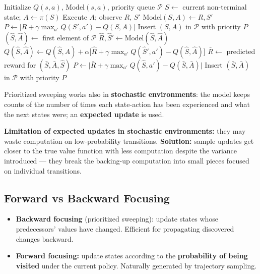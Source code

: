\documentclass[11pt,a4paper]{article}
\theoremstyle{definition}
\theoremstyle{plain}
\theoremstyle{remark}
\begin{document}
\begin{algorithm}
\caption{Prioritized Sweeping (deterministic environments)}
\begin{algorithmic}
\STATE Initialize $Q(s, a)$, $\text{Model}(s, a)$, priority queue $\mathcal{P}$
\LOOP
    \STATE $S \leftarrow$ current non-terminal state; $A \leftarrow \pi(S)$
    \STATE Execute $A$; observe $R$, $S'$
    \STATE $\text{Model}(S, A) \leftarrow R, S'$
    \STATE $P \leftarrow \bigl|R + \gamma \max_{a'} Q(S', a') - Q(S, A)\bigr|$
     \STATE Insert $(S, A)$ in $\mathcal{P}$ with priority $P$ \ENDIF
    \REPEAT
        \STATE $(\hat{S}, \hat{A}) \leftarrow$ first element of $\mathcal{P}$
        \STATE $\hat{R}, \hat{S}' \leftarrow \text{Model}(\hat{S}, \hat{A})$
        \STATE $Q(\hat{S}, \hat{A}) \leftarrow Q(\hat{S}, \hat{A}) + \alpha\bigl[\hat{R} + \gamma \max_{a'} Q(\hat{S}', a') - Q(\hat{S}, \hat{A})\bigr]$
            \STATE $\bar{R} \leftarrow$ predicted reward for $(\bar{S}, \bar{A}, \hat{S})$
            \STATE $P \leftarrow \bigl|\bar{R} + \gamma \max_{a'} Q(\hat{S}, a') - Q(\bar{S}, \bar{A})\bigr|$
             \STATE Insert $(\bar{S}, \bar{A})$ in $\mathcal{P}$ with priority $P$ \ENDIF
        \ENDFOR
\ENDLOOP
\end{algorithmic}
\end{algorithm}

Prioritized sweeping works also in \textbf{stochastic environments}: the model keeps counts of the number of times each state-action has been experienced and what the next states were; an \textbf{expected update} is used.

\textbf{Limitation of expected updates in stochastic environments:} they may waste computation on low-probability transitions. \textbf{Solution:} sample updates get closer to the true value function with less computation despite the variance introduced — they break the backing-up computation into small pieces focused on individual transitions.

\subsection{Forward vs Backward Focusing}

\begin{itemize}
    \item \textbf{Backward focusing} (prioritized sweeping): update states whose predecessors' values have changed. Efficient for propagating discovered changes backward.
    \item \textbf{Forward focusing:} update states according to the \textbf{probability of being visited} under the current policy. Naturally generated by trajectory sampling.
\end{itemize}
\end{document}
